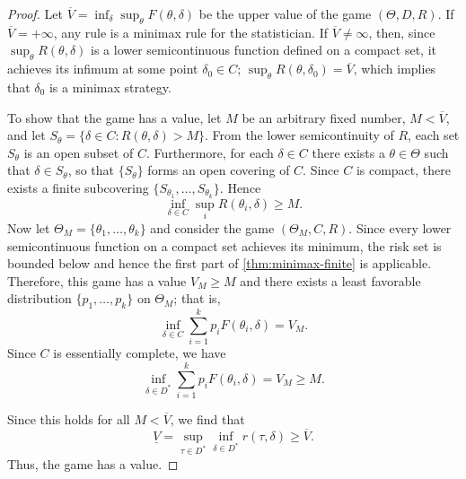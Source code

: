 \begin{proof}
	Let $\overline{V}=\inf_\delta\sup_\theta F(\theta,\delta)$ be the upper value of the game $(\Theta, D, R)$. If $\overline{V}=+\infty$, any rule is a minimax rule for the statistician. If $\overline{V}\neq \infty$, then, since $\sup_\theta R(\theta,\delta)$ is a lower semicontinuous function defined on a compact set, it achieves its infimum at some point $\delta_0\in C$; $\sup_\theta R(\theta,\delta_0)=\overline{V}$, which implies that $\delta_0$ is a minimax strategy.
	
	To show that the game has a value, let $M$ be an arbitrary fixed number, $M<\overline{V}$, and let $S_\theta=\{\delta\in C\colon R(\theta,\delta)>M\}$. From the lower semicontinuity of $R$, each set $S_\theta$ is an open subset of $C$. Furthermore, for each $\delta\in C$ there exists a $\theta\in \Theta$ such that $\delta\in S_\theta$, so that $\{S_\theta\}$ forms an open covering of $C$. Since $C$ is compact, there exists a finite subcovering $\{S_{\theta_1},\dots,S_{\theta_k}\}$. Hence\[
\inf_{\delta\in C}\sup_iR(\theta_i,\delta)\geq M.
\]
Now let $\Theta_M=\{\theta_1,\dots,\theta_k\}$ and consider the game $(\Theta_M,C,R)$. Since every lower semicontinuous function on a compact set achieves its minimum, the risk set is bounded below and hence the first part of \autoref{thm:minimax-finite} is applicable. Therefore, this game has a value $V_M\geq M$ and there exists a least favorable distribution $\{p_1,\dots,p_k\}$ on $\Theta_M$; that is,
\[
\inf_{\delta\in C}\sum_{i=1}^{k}p_iF(\theta_i,\delta)=V_M.
\]
Since $C$ is essentially complete, we have
\[
\inf_{\delta\in D^\ast}\sum_{i=1}^{k}p_iF(\theta_i,\delta)=V_M\geq M.
\]

Since this holds for all $M<\overline{V}$, we find that
\[
\underline{V}=\sup_{\tau\in D^\ast}\inf_{\delta\in D^\ast} r(\tau,\delta)\geq \overline{V}.
\]
Thus, the game has a value.
\end{proof}